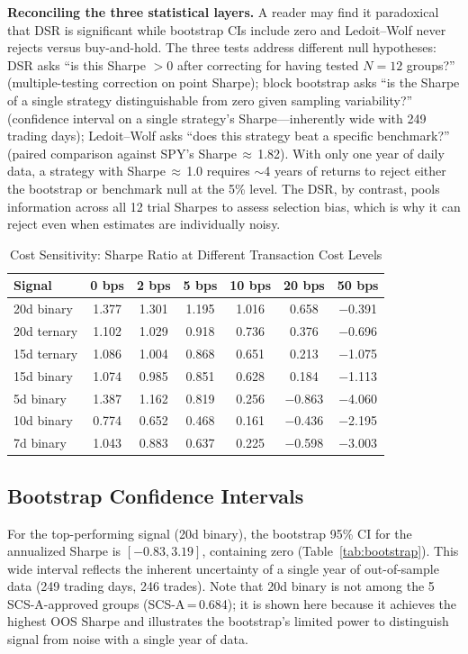 \documentclass[12pt,a4paper]{article}
\begin{document}
\textbf{Reconciling the three statistical layers.} A reader may find it paradoxical that DSR is significant while bootstrap CIs include zero and Ledoit--Wolf never rejects versus buy-and-hold. The three tests address different null hypotheses: DSR asks ``is this Sharpe $>0$ after correcting for having tested $N=12$ groups?'' (multiple-testing correction on point Sharpe); block bootstrap asks ``is the Sharpe of a single strategy distinguishable from zero given sampling variability?'' (confidence interval on a single strategy's Sharpe---inherently wide with 249 trading days); Ledoit--Wolf asks ``does this strategy beat a specific benchmark?'' (paired comparison against SPY's Sharpe\,$\approx$\,1.82). With only one year of daily data, a strategy with Sharpe\,$\approx$\,1.0 requires $\sim$4 years of returns to reject either the bootstrap or benchmark null at the 5\% level. The DSR, by contrast, pools information across all 12 trial Sharpes to assess selection bias, which is why it can reject even when estimates are individually noisy.

\begin{table}[H]
\centering
\caption{Cost Sensitivity: Sharpe Ratio at Different Transaction Cost Levels}
\label{tab:cost}
\begin{tabular}{lcccccc}
\toprule
Signal & 0 bps & 2 bps & 5 bps & 10 bps & 20 bps & 50 bps \\
\midrule
20d binary  & 1.377 & 1.301 & 1.195 & 1.016 & 0.658 & $-$0.391 \\
20d ternary & 1.102 & 1.029 & 0.918 & 0.736 & 0.376 & $-$0.696 \\
15d ternary & 1.086 & 1.004 & 0.868 & 0.651 & 0.213 & $-$1.075 \\
15d binary  & 1.074 & 0.985 & 0.851 & 0.628 & 0.184 & $-$1.113 \\
5d binary   & 1.387 & 1.162 & 0.819 & 0.256 & $-$0.863 & $-$4.060 \\
10d binary  & 0.774 & 0.652 & 0.468 & 0.161 & $-$0.436 & $-$2.195 \\
7d binary   & 1.043 & 0.883 & 0.637 & 0.225 & $-$0.598 & $-$3.003 \\
\bottomrule
\end{tabular}
\end{table}

\subsection{Bootstrap Confidence Intervals}

For the top-performing signal (20d binary), the bootstrap 95\% CI for the annualized Sharpe is $[-0.83, 3.19]$, containing zero (Table~\ref{tab:bootstrap}). This wide interval reflects the inherent uncertainty of a single year of out-of-sample data (249 trading days, 246 trades). Note that 20d binary is not among the 5 SCS-A-approved groups (SCS-A\,=\,0.684); it is shown here because it achieves the highest OOS Sharpe and illustrates the bootstrap's limited power to distinguish signal from noise with a single year of data.
\end{document}
